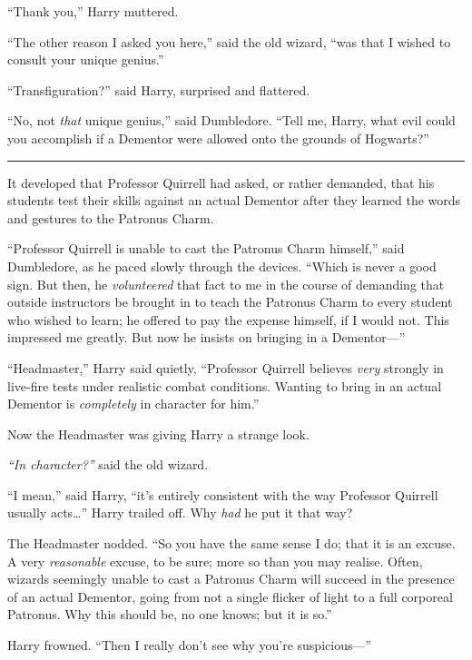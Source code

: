 ``Thank you,'' Harry muttered.

``The other reason I asked you here,'' said the old wizard, ``was that I
wished to consult your unique genius.''

``Transfiguration?'' said Harry, surprised and flattered.

``No, not \emph{that} unique genius,'' said Dumbledore. ``Tell me,
Harry, what evil could you accomplish if a Dementor were allowed onto
the grounds of Hogwarts?''

\begin{center}\rule{3in}{0.4pt}\end{center}

It developed that Professor Quirrell had asked, or rather demanded, that
his students test their skills against an actual Dementor after they
learned the words and gestures to the Patronus Charm.

``Professor Quirrell is unable to cast the Patronus Charm himself,''
said Dumbledore, as he paced slowly through the devices. ``Which is
never a good sign. But then, he \emph{volunteered} that fact to me in
the course of demanding that outside instructors be brought in to teach
the Patronus Charm to every student who wished to learn; he offered to
pay the expense himself, if I would not. This impressed me greatly. But
now he insists on bringing in a Dementor---''

``Headmaster,'' Harry said quietly, ``Professor Quirrell believes
\emph{very} strongly in live-fire tests under realistic combat
conditions. Wanting to bring in an actual Dementor is \emph{completely}
in character for him.''

Now the Headmaster was giving Harry a strange look.

\emph{``In character?''} said the old wizard.

``I mean,'' said Harry, ``it's entirely consistent with the way
Professor Quirrell usually acts\ldots{}'' Harry trailed off. Why
\emph{had} he put it that way?

The Headmaster nodded. ``So you have the same sense I do; that it is an
excuse. A very \emph{reasonable} excuse, to be sure; more so than you
may realise. Often, wizards seemingly unable to cast a Patronus Charm
will succeed in the presence of an actual Dementor, going from not a
single flicker of light to a full corporeal Patronus. Why this should
be, no one knows; but it is so.''

Harry frowned. ``Then I really don't see why you're suspicious---''

